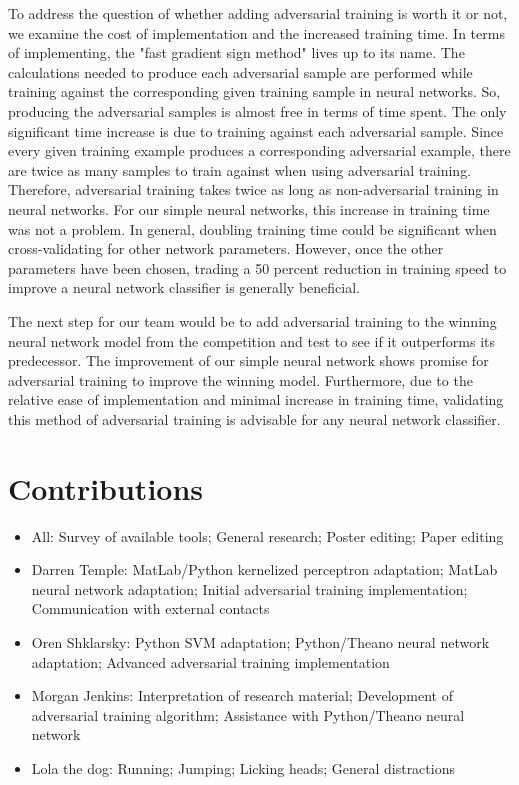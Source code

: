 \documentclass          {article} %
\begin{document}
To address the question of whether adding adversarial training is worth it or not, we examine the cost of implementation and the increased training time. In terms of implementing, the "fast gradient sign method" lives up to its name. The calculations needed to produce each adversarial sample are performed while training against the corresponding given training sample in neural networks. So, producing the adversarial samples is almost free in terms of time spent. The only significant time increase is due to training against each adversarial sample. Since every given training example produces a corresponding adversarial example, there are twice as many samples to train against when using adversarial training. Therefore, adversarial training takes twice as long as non-adversarial training in neural networks. For our simple neural networks, this increase in training time was not a problem. In general, doubling training time could be significant when cross-validating for other network parameters. However, once the other parameters have been chosen, trading a 50 percent reduction in training speed to improve a neural network classifier is generally beneficial.

The next step for our team would be to add adversarial training to the winning neural network model from the competition and test to see if it outperforms its predecessor. The improvement of our simple neural network shows promise for adversarial training to improve the winning model. Furthermore, due to the relative ease of implementation and minimal increase in training time, validating this method of adversarial training is advisable for any neural network classifier.


               \section*{Contributions}
               \label   {sec:contributions}

\begin{itemize}
\item All: Survey of available tools; General research; Poster editing; Paper editing
\item Darren Temple: MatLab/Python kernelized perceptron adaptation; MatLab neural network adaptation; Initial adversarial training implementation; Communication with external contacts
\item Oren Shklarsky: Python SVM adaptation; Python/Theano neural network adaptation; Advanced adversarial training implementation
\item Morgan Jenkins: Interpretation of research material; Development of adversarial training algorithm; Assistance with Python/Theano neural network
\item Lola the dog: Running; Jumping; Licking heads; General distractions
\end{itemize}
\end{document}
